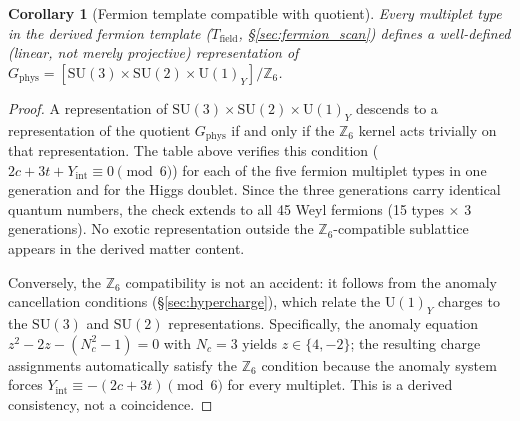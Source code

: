 \documentclass[11pt,a4paper]{article}
\newtheorem{corollary}[theorem]{Corollary}
\theoremstyle{definition}
\newcommand{\SU}{\mathrm{SU}}
\newcommand{\U}{\mathrm{U}}
\begin{document}
\begin{corollary}[Fermion template compatible with quotient]%
\label{cor:fermion_Z6_compat}
Every multiplet type in the derived fermion template
($T_{\mathrm{field}}$, \S\ref{sec:fermion_scan}) defines a
well-defined (linear, not merely projective) representation of
$G_{\mathrm{phys}} = [\SU(3) \times \SU(2) \times \U(1)_Y] /
\mathbb{Z}_6$.
\end{corollary}

\begin{proof}
A representation of $\SU(3) \times \SU(2) \times \U(1)_Y$ descends
to a representation of the quotient
$G_{\mathrm{phys}}$ if and only if the $\mathbb{Z}_6$ kernel acts
trivially on that representation.  The table above verifies this
condition ($2c + 3t + Y_{\mathrm{int}} \equiv 0 \pmod{6}$) for each
of the five fermion multiplet types in one generation and for the
Higgs doublet.  Since the three generations carry identical quantum
numbers, the check extends to all 45 Weyl fermions (15 types
$\times$ 3 generations).  No exotic representation outside the
$\mathbb{Z}_6$-compatible sublattice appears in the derived matter
content.

Conversely, the $\mathbb{Z}_6$ compatibility is not an accident:
it follows from the anomaly cancellation conditions
(\S\ref{sec:hypercharge}), which relate the $\U(1)_Y$ charges to
the $\SU(3)$ and $\SU(2)$ representations.  Specifically, the
anomaly equation
$z^2 - 2z - (N_c^2 - 1) = 0$ with $N_c = 3$ yields
$z \in \{4, -2\}$; the resulting charge assignments automatically
satisfy the $\mathbb{Z}_6$ condition because the anomaly system
forces $Y_{\mathrm{int}} \equiv -(2c + 3t) \pmod{6}$ for every
multiplet.  This is a derived consistency, not a coincidence.
\end{proof}
\end{document}
